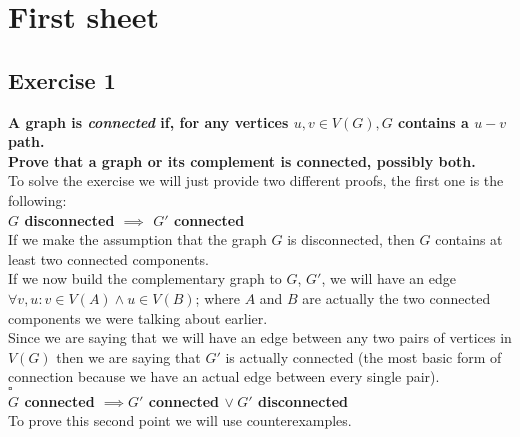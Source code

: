\section*{First sheet}
\subsection*{Exercise 1}
\boldmath
\textbf{A graph is \textit{connected} if, for any vertices $u, v \in V(G), G$ contains a $u - v$ path.\\
Prove that a graph or its complement is connected, possibly both.}\vspace{10pt}\\
\unboldmath
To solve the exercise we will just provide two different proofs, the first one is the following:\vspace{5pt}\\
\boldmath
\textbf{$G$ disconnected $\implies$ $G'$ connected}\vspace{5pt}\\
\unboldmath
If we make the assumption that the graph $G$ is disconnected, then $G$ contains at least two connected components.\\
If we now build the complementary graph to $G$, $G'$, we will have an edge $\forall v, u : v \in V(A) \land u \in V(B)$; where $A$ and $B$ are actually the two connected components we were talking about earlier.\\
Since we are saying that we will have an edge between any two pairs of vertices in $V(G)$ then we are saying that $G'$ is actually connected (the most basic form of connection because we have an actual edge between every single pair).
\vspace{2pt}\\\hspace*{3cm}$\square$\vspace*{10pt}\\
\boldmath
\textbf{$G$ connected $\implies G'$ connected $\vee\hspace{3pt} G'$ disconnected}\vspace{5pt}\\
\unboldmath
To prove this second point we will use counterexamples. \\
